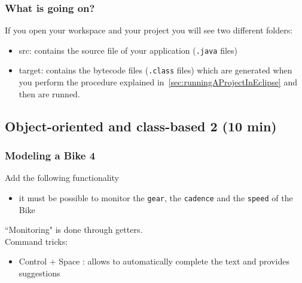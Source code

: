 \documentclass{article}
\theoremstyle{definition}
\begin{document}
\subsubsection{What is going on?}
If you open your workspace and your project you will see two different folders:
\begin{itemize}
\item src: contains the source file of your application (\texttt{.java} files)
\item target: contains the bytecode files (\texttt{.class} files) which are generated when you perform the procedure explained in~\ref{sec:runningAProjectInEclipse} and then are runned.
\end{itemize}

\subsection{Object-oriented and class-based 2 (10 min)}

\subsubsection{Modeling a Bike 4}
Add the following functionality
\begin{itemize}
\item it must be possible to monitor the \texttt{gear}, the \texttt{cadence} and the \texttt{speed} of the Bike
\end{itemize}

``Monitoring" is done through getters.\\
Command tricks:
\begin{itemize}
\item Control + Space : allows to automatically complete the text and provides suggestions
\end{itemize}
\end{document}
